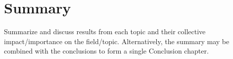 \chapter{Summary}\label{chap:summary}

Summarize and discuss results from each topic and their collective impact/importance on the field/topic. Alternatively, the summary may be combined with the conclusions to form a single Conclusion chapter.
\endinput

